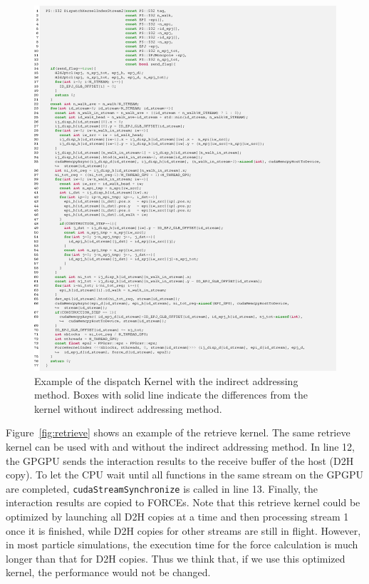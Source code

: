 \documentclass[dvipdfmx]{pasj01}
\begin{document}
\begin{figure}
    \begin{center}
      \includegraphics[width=18cm]{./fig/snipet/src_dispatch_index.eps}
    \end{center}
    \caption{Example of the dispatch Kernel with the indirect
      addressing method. Boxes with solid line indicate the
      differences from the kernel without indirect addressing
      method. }
  \label{fig:dispatch_index}
\end{figure}

Figure~\ref{fig:retrieve} shows an example of the retrieve kernel. The
same retrieve kernel can be used with and without the indirect
addressing method. In line 12, the GPGPU sends the interaction results
to the receive buffer of the host (D2H copy). To let the CPU wait
until all functions in the same stream on the GPGPU are completed,
{\tt cudaStreamSynchronize} is called in line 13. Finally, the
interaction results are copied to FORCEs. Note that this retrieve
kernel could be optimized by launching all D2H copies at a time and
then processing stream 1 once it is finished, while D2H copies for
other streams are still in flight. However, in most particle
simulations, the execution time for the force calculation is much
longer than that for D2H copies. Thus we think that, if we use this
optimized kernel, the performance would not be changed.
\end{document}
